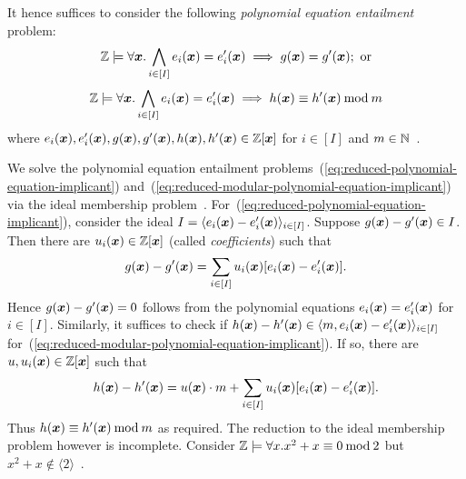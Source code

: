 It hence suffices to consider the following
\emph{polynomial equation entailment} problem:
\begin{equation}
  \label{eq:reduced-polynomial-equation-implicant}
  \bbfZ \models \forall \vx. %
  \bigwedge\limits_{i \in [I]} e_i (\vx) = e'_i (\vx)
  \implies
  g (\vx) = g' (\vx); \textmd{ or}
\end{equation}
 \begin{equation}
   \label{eq:reduced-modular-polynomial-equation-implicant}
   \bbfZ \models \forall \vx. %
   \bigwedge\limits_{i \in [I]} e_i (\vx) = e'_i (\vx)
   \implies
   h (\vx) \equiv h' (\vx) \mod m
 \end{equation}
 where $e_i (\vx), e'_i (\vx), g (\vx), g' (\vx), h (\vx), h' (\vx)
 \in \bbfZ[\vx]$ for $i \in [I]$ and $m \in \mathbb{N}$~\cite{H:07:AENTP}.

We solve the polynomial equation entailment
problems~(\ref{eq:reduced-polynomial-equation-implicant}) 
and~(\ref{eq:reduced-modular-polynomial-equation-implicant}) via
the ideal membership problem~\cite{H:07:AENTP,BS:16:GFEV}. 
For~(\ref{eq:reduced-polynomial-equation-implicant}), consider the
ideal $I = \langle e_i(\vx) - e'_i(\vx) \rangle_{i \in [I]}$. Suppose
$g(\vx) - g'(\vx) \in I$. Then there are $u_i(\vx) \in \bbfZ[\vx]$
(called \emph{coefficients}) such that 
\begin{equation}
  \label{eq:reduced-polynomial-equation-witnesses}
  g(\vx) - g'(\vx) = \sum\limits_{i \in [I]} u_i (\vx) [e_i (\vx) - e'_i (\vx)].
\end{equation}
Hence $g(\vx) - g'(\vx) = 0$ follows from  the polynomial equations
$e_i (\vx) = e'_i (\vx)$ for $i \in [I]$. Similarly, it
suffices to check if $h(\vx) - h'(\vx) \in \langle m, e_i(\vx) -
e'_i(\vx) \rangle_{i \in [I]}$
for~(\ref{eq:reduced-modular-polynomial-equation-implicant}).
If so, there are $u, u_i(\vx) \in \bbfZ[\vx]$ such that
\begin{equation}
  \label{eq:reduced-modular-polynomial-equation-witnesses}
  h(\vx) - h'(\vx) = u(\vx) \cdot m + \sum\limits_{i \in [I]} u_i (\vx)
  [e_i (\vx) - e'_i (\vx)]. 
\end{equation}
Thus $h(\vx) \equiv h'(\vx) \mod m$ as required.
The reduction to the ideal membership problem however is 
incomplete. Consider $\mathbb{Z} \models \forall x. x^2 + x
\equiv 0 \mathbin{\textmd{mod}} 2$ but $x^2 + x \not\in \langle 2
\rangle$~\cite{H:07:AENTP}. 

